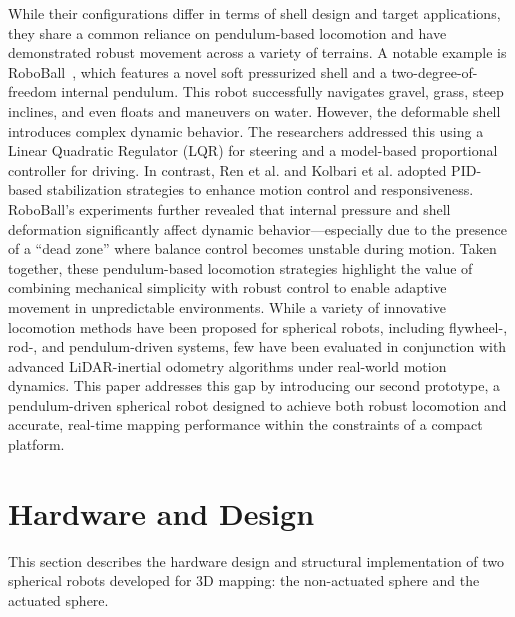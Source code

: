 \documentclass[a4paper, conference]{IEEEtran}
\begin{document}
While their configurations differ in terms of shell design and target applications, they share a common reliance on pendulum-based locomotion and have demonstrated robust movement across a variety of terrains.
A notable example is RoboBall~\cite{roboball}, which features a novel soft pressurized shell and a two-degree-of-freedom internal pendulum. 
This robot successfully navigates gravel, grass, steep inclines, and even floats and maneuvers on water. 
However, the deformable shell introduces complex dynamic behavior. 
The researchers addressed this using a Linear Quadratic Regulator (LQR) for steering and a model-based proportional controller for driving. 
In contrast, Ren et al. \cite{novelsphere} and Kolbari et al. \cite{pendulum_sphere} adopted PID-based stabilization strategies to enhance motion control and responsiveness. 
RoboBall’s experiments further revealed that internal pressure and shell deformation significantly affect dynamic behavior—especially due to the presence of a ``dead zone'' where balance control becomes unstable during motion.
Taken together, these pendulum-based locomotion strategies highlight the value of combining mechanical simplicity with robust control to enable adaptive movement in unpredictable environments. 
While a variety of innovative locomotion methods have been proposed for spherical robots, including flywheel-, rod-, and pendulum-driven systems, few have been evaluated in conjunction with advanced LiDAR-inertial odometry algorithms under real-world motion dynamics.
This paper addresses this gap by introducing our second prototype, a pendulum-driven spherical robot designed to achieve both robust locomotion and accurate, real-time mapping performance within the constraints of a compact platform.

\section{Hardware and Design}\label{sec:hardwaredesing}
This section describes the hardware design and structural implementation of two spherical robots developed for 3D mapping: the non-actuated sphere and the actuated sphere.
\end{document}
